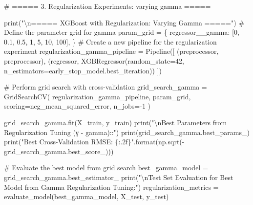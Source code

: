 \documentclass[
  letterpaper,
  DIV=11,
  numbers=noendperiod]{scrreprt}
\newenvironment{Shaded}{\begin{snugshade}}{\end{snugshade}}
\newcommand{\BuiltInTok}[1]{\textcolor[rgb]{0.00,0.23,0.31}{#1}}
\newcommand{\CharTok}[1]{\textcolor[rgb]{0.13,0.47,0.30}{#1}}
\newcommand{\CommentTok}[1]{\textcolor[rgb]{0.37,0.37,0.37}{#1}}
\newcommand{\DecValTok}[1]{\textcolor[rgb]{0.68,0.00,0.00}{#1}}
\newcommand{\FloatTok}[1]{\textcolor[rgb]{0.68,0.00,0.00}{#1}}
\newcommand{\NormalTok}[1]{\textcolor[rgb]{0.00,0.23,0.31}{#1}}
\newcommand{\OperatorTok}[1]{\textcolor[rgb]{0.37,0.37,0.37}{#1}}
\newcommand{\SpecialCharTok}[1]{\textcolor[rgb]{0.37,0.37,0.37}{#1}}
\newcommand{\StringTok}[1]{\textcolor[rgb]{0.13,0.47,0.30}{#1}}
\begin{document}
\begin{Shaded}
\begin{Highlighting}[]
\CommentTok{\# ===== 3. Regularization Experiments: varying gamma =====}

\BuiltInTok{print}\NormalTok{(}\StringTok{"}\CharTok{\textbackslash{}n}\StringTok{===== XGBoost with Regularization: Varying Gamma ====="}\NormalTok{)}
\CommentTok{\# Define the parameter grid for gamma}
\NormalTok{param\_grid }\OperatorTok{=}\NormalTok{ \{}
    \StringTok{\textquotesingle{}regressor\_\_gamma\textquotesingle{}}\NormalTok{: [}\DecValTok{0}\NormalTok{, }\FloatTok{0.1}\NormalTok{, }\FloatTok{0.5}\NormalTok{, }\DecValTok{1}\NormalTok{, }\DecValTok{5}\NormalTok{, }\DecValTok{10}\NormalTok{, }\DecValTok{100}\NormalTok{],}
\NormalTok{\}}
\CommentTok{\# Create a new pipeline for the regularization experiment}
\NormalTok{regularization\_gamma\_pipeline }\OperatorTok{=}\NormalTok{ Pipeline([}
\NormalTok{    (}\StringTok{\textquotesingle{}preprocessor\textquotesingle{}}\NormalTok{, preprocessor),}
\NormalTok{    (}\StringTok{\textquotesingle{}regressor\textquotesingle{}}\NormalTok{, XGBRegressor(random\_state}\OperatorTok{=}\DecValTok{42}\NormalTok{, n\_estimators}\OperatorTok{=}\NormalTok{early\_stop\_model.best\_iteration))}
\NormalTok{])}

\CommentTok{\# Perform grid search with cross{-}validation}
\NormalTok{grid\_search\_gamma }\OperatorTok{=}\NormalTok{ GridSearchCV(}
\NormalTok{    regularization\_gamma\_pipeline,}
\NormalTok{    param\_grid,}
\NormalTok{    scoring}\OperatorTok{=}\StringTok{\textquotesingle{}neg\_mean\_squared\_error\textquotesingle{}}\NormalTok{,}
\NormalTok{    n\_jobs}\OperatorTok{={-}}\DecValTok{1}
\NormalTok{)}

\NormalTok{grid\_search\_gamma.fit(X\_train, y\_train)}
\BuiltInTok{print}\NormalTok{(}\StringTok{"}\CharTok{\textbackslash{}n}\StringTok{Best Parameters from Regularization Tuning (γ {-} gamma)::"}\NormalTok{)}
\BuiltInTok{print}\NormalTok{(grid\_search\_gamma.best\_params\_)}
\BuiltInTok{print}\NormalTok{(}\StringTok{"Best Cross{-}Validation RMSE: }\SpecialCharTok{\{:.2f\}}\StringTok{"}\NormalTok{.}\BuiltInTok{format}\NormalTok{(np.sqrt(}\OperatorTok{{-}}\NormalTok{grid\_search\_gamma.best\_score\_)))}

\CommentTok{\# Evaluate the best model from grid search}
\NormalTok{best\_gamma\_model }\OperatorTok{=}\NormalTok{ grid\_search\_gamma.best\_estimator\_}
\BuiltInTok{print}\NormalTok{(}\StringTok{"}\CharTok{\textbackslash{}n}\StringTok{Test Set Evaluation for Best Model from Gamma Regularization Tuning:"}\NormalTok{)}
\NormalTok{regularization\_metrics }\OperatorTok{=}\NormalTok{ evaluate\_model(best\_gamma\_model, X\_test, y\_test)}
\end{Highlighting}
\end{Shaded}
\end{document}
